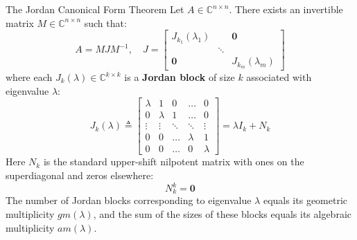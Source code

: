 \begin{theorembox}{The Jordan Canonical Form Theorem}
\label{thm:jordan_canonical_form}
Let $A \in \mathbb{C}^{n \times n}$. There exists an invertible matrix $M \in \mathbb{C}^{n \times n}$ such that:
\begin{equation}
A = M J M^{-1}, \quad J = \begin{bmatrix}
J_{k_1}(\lambda_1) & & \mathbf{0} \\
& \ddots & \\
\mathbf{0} & & J_{k_m}(\lambda_m)
\end{bmatrix}
\label{eq:jordan_decomposition}
\end{equation}
where each $J_{k}(\lambda) \in \mathbb{C}^{k \times k}$ is a \textbf{Jordan block} of size $k$ associated with eigenvalue $\lambda$:
\begin{equation}
J_k(\lambda) \triangleq \begin{bmatrix}
\lambda & 1 & 0 & \dots & 0 \\
0 & \lambda & 1 & \dots & 0 \\
\vdots & \vdots & \ddots & \ddots & \vdots \\
0 & 0 & \dots & \lambda & 1 \\
0 & 0 & \dots & 0 & \lambda
\end{bmatrix} = \lambda I_k + N_k
\label{eq:jordan_block}
\end{equation}
Here $N_k$ is the standard upper-shift nilpotent matrix with ones on the superdiagonal and zeros elsewhere:
\begin{equation}
N_k^k = \mathbf{0}
\end{equation}
The number of Jordan blocks corresponding to eigenvalue $\lambda$ equals its geometric multiplicity $gm(\lambda)$, and the sum of the sizes of these blocks equals its algebraic multiplicity $am(\lambda)$.
\end{theorembox}

